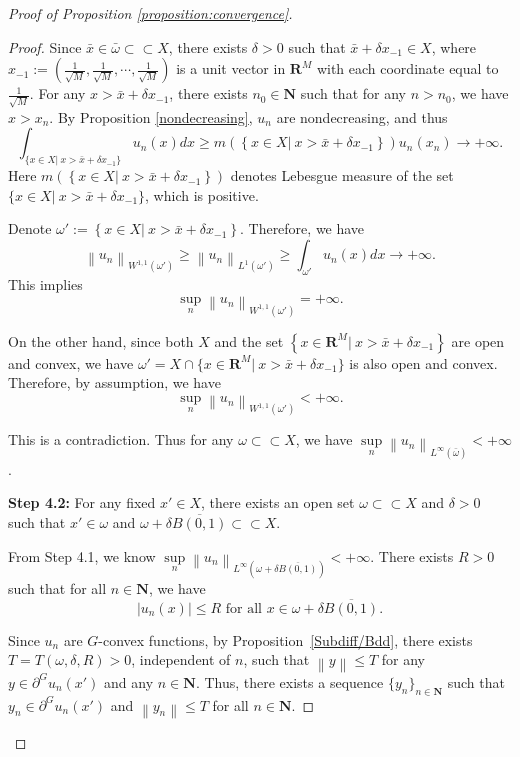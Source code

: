 \documentclass[a4paper, 11pt]{amsart}
\numberwithin{equation}{section}
\theoremstyle{plain}
\theoremstyle{definition}
\theoremstyle{remark}
\newcommand{\R}{\mathbf{R}}
\newcommand{\N}{\mathbf{N}}
\newcommand{\norm}[1]{\left\lVert#1\right\rVert}
\begin{document}
\begin{proof}[Proof of Proposition \ref{proposition:convergence}]
\begin{proof}
	Since $\bar{x} \in \bar{\omega} \subset \subset X$, there exists $\delta >0$ such that $\bar{x}+\delta x_{-1} \in X$, where $x_{-1}:=(\frac{1}{\sqrt{M}}, \frac{1}{\sqrt{M}}, \cdots, \frac{1}{\sqrt{M}})$ is a unit vector in $\R^M$ with each coordinate equal to $\frac{1}{\sqrt{M}}$. For any $x>\bar{x} + \delta x_{-1}$, there exists $n_0\in \N$ such that for any $n>n_0$, we have $x>x_n$. By Proposition \ref{nondecreasing}, $u_n$ are nondecreasing, and thus
	\begin{equation}\label{eqn_integral}
	\int_{\{x\in X|~ x>\bar{x} +\delta x_{-1}\}} u_n(x)dx \ge m\left(\left\{x\in X|~ x> \bar{x}+\delta x_{-1}\right\}\right) u_n(x_n)\rightarrow +\infty.
	\end{equation}
	Here $m\left(\left\{x\in X|~ x>\bar{x}+\delta x_{-1}\right\}\right)$ denotes Lebesgue measure of the set $\{x\in X|~ x>\bar{x}+\delta x_{-1}\}$, which is positive.
	
	Denote $\omega' := \left\{x\in X|~ x>\bar{x}+\delta x_{-1}\right\}$. Therefore, we have $$\norm{u_n}_{W^{1,1}(\omega')} \ge \norm{u_n}_{L^{1}(\omega')} \ge \int_{\omega'} u_n(x) dx \rightarrow +\infty.$$ 
	This implies 
	$$\sup\limits_{n} \norm{u_n}_{W^{1,1}(\omega')} = +\infty.$$
	
	On the other hand, since both $X$ and the set $\left\{x\in \R^M|~ x> \bar{x}+\delta x_{-1} \right\}$ are open and convex, we have  $\omega' = X \cap \{x\in \R^M|~ x> \bar{x}+\delta x_{-1} \}$ is also open and convex. Therefore, by assumption, we have 
	$$\sup\limits_{n} \norm{u_n}_{W^{1,1}(\omega')} < +\infty.$$ 
	
	This is a contradiction. Thus for any $\omega \subset \subset X$, we have $\sup\limits_{n}\norm{u_n}_{L^{\infty}(\bar{\omega})}<+\infty$.\medskip
	
	{\bf Step 4.2:} For any fixed $x'\in X$, there exists an open set $\omega \subset \subset X$ and $\delta>0$ such that $x'\in \omega$ and $\omega + \delta \overline{B(0,1)} \subset \subset X$.
	
	From Step 4.1, we know  $\sup\limits_{n}\norm{u_n}_{L^{\infty}\left(\omega + \delta \overline{B(0,1)}\right)} < +\infty$. 
	There exists $R>0$ such that for all $n\in \N$, we have 
	$$|u_n(x)|\le R \text{ for all $x \in \omega + \delta \overline{B(0,1)}$.}$$ 
	
	Since $u_n$ are $G$-convex functions, by Proposition~\ref{Subdiff/Bdd}, there exists $T = T(\omega, \delta, R) >0$, independent of $n$, such that $\norm{y}\le T$ for any $y \in \partial^G u_n(x')$ and any $n\in \N$. Thus, there exists a sequence $\{y_n\}_{n\in \N}$ such that $y_n \in \partial^G u_n(x')$ and $\norm{y_n}\le T$ for all $n\in \N$.\medskip
	

\end{proof}
\end{proof}
\end{document}
